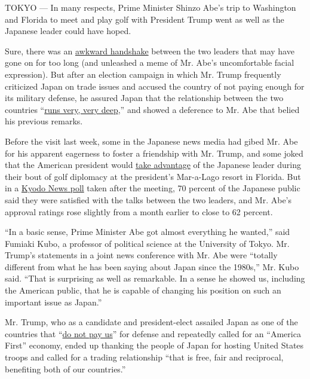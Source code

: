 TOKYO --- In many respects, Prime Minister Shinzo Abe's trip to
Washington and Florida to meet and play golf with President Trump went
as well as the Japanese leader could have hoped.

Sure, there was an
\href{https://www.youtube.com/watch?v=GWbP8eC-SIw\&feature=player_embedded}{awkward
handshake} between the two leaders that may have gone on for too long
(and unleashed a meme of Mr. Abe's uncomfortable facial expression). But
after an election campaign in which Mr. Trump frequently criticized
Japan on trade issues and accused the country of not paying enough for
its military defense, he assured Japan that the relationship between the
two countries
``\href{https://www.nytimes.com/2017/02/10/world/asia/trump-shinzo-abe-meeting.html?smid=tw-share}{runs
very, very deep},'' and showed a deference to Mr. Abe that belied his
previous remarks.

Before the visit last week, some in the Japanese news media had gibed
Mr. Abe for his apparent eagerness to foster a friendship with Mr.
Trump, and some joked that the American president would
\href{https://twitter.com/motokorich/status/829946184269656065}{take
advantage} of the Japanese leader during their bout of golf diplomacy at
the president's Mar-a-Lago resort in Florida. But in a
\href{http://english.kyodonews.jp/news/2017/02/458432.html}{Kyodo News
poll} taken after the meeting, 70 percent of the Japanese public said
they were satisfied with the talks between the two leaders, and Mr.
Abe's approval ratings rose slightly from a month earlier to close to 62
percent.

``In a basic sense, Prime Minister Abe got almost everything he
wanted,'' said Fumiaki Kubo, a professor of political science at the
University of Tokyo. Mr. Trump's statements in a joint news conference
with Mr. Abe were ``totally different from what he has been saying about
Japan since the 1980s,'' Mr. Kubo said. ``That is surprising as well as
remarkable. In a sense he showed us, including the American public, that
he is capable of changing his position on such an important issue as
Japan.''

Mr. Trump, who as a candidate and president-elect assailed Japan as one
of the countries that
``\href{https://www.nytimes.com/2016/09/27/us/politics/transcript-debate.html?_r=0}{do
not pay us}'' for defense and repeatedly called for an ``America First''
economy, ended up thanking the people of Japan for hosting United States
troops and called for a trading relationship ``that is free, fair and
reciprocal, benefiting both of our countries.''

